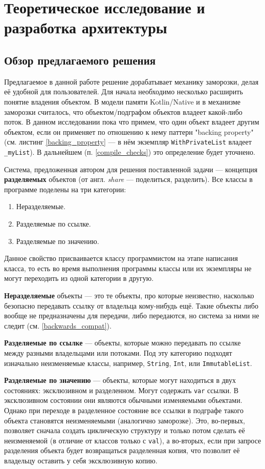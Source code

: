 \documentclass[specification,annotation,times]{itmo-student-thesis}
\begin{document}
\chapter{Теоретическое исследование и разработка архитектуры}

\section{Обзор предлагаемого решения}\label{overview}

Предлагаемое в данной работе решение дорабатывает механику заморозки, делая её удобной для пользователей.
Для начала необходимо несколько расширить понятие владения объектом.
В модели памяти Kotlin/Native и в механизме заморозки считалось, что объектом/подграфом объектов владеет какой-либо поток.
В данном исследовании пока что примем, что один объект владеет другим объектом, если он применяет по отношению к нему паттерн "backing property" (см. листинг \ref{backing_property} --- в нём экземпляр \texttt{WithPrivateList} владеет \texttt{\_myList}). В дальнейшем (п. \ref{compile_checks}) это определение будет уточнено.

Система, предложенная автором для решения поставленной задачи --- концепция \textbf{разделяемых} объектов (от англ. \textit{share} --- поделиться, разделить).
Все классы в программе поделены на три категории:
\begin{enumerate}
	\item Неразделяемые.
	\item Разделяемые по ссылке.
	\item Разделяемые по значению.
\end{enumerate}

Данное свойство присваивается классу программистом на этапе написания класса, то есть во время выполнения программы классы или их экземпляры не могут переходить из одной категории в другую.

\textbf{Неразделяемые} объекты --- это те объекты, про которые неизвестно, насколько безопасно передавать ссылку от владельца кому-нибудь ещё.
Такие объекты либо вообще не предназначены для передачи, либо передаются, но система за ними не следит (см. \ref{backwards_compat}).

\textbf{Разделяемые по ссылке} --- объекты, которые можно передавать по ссылке между разными владельцами или потоками.
Под эту категорию подходят изначально неизменяемые классы, например, \texttt{String}, \texttt{Int}, или \texttt{ImmutableList}.

\textbf{Разделяемые по значению} --- объекты, которые могут находиться в двух состояниях: эксклюзивном и разделенном. Могут содержать \texttt{var} ссылки.
В эксклюзивном состоянии они являются обычными изменяемыми объектами.
Однако при переходе в разделенное состояние все ссылки в подграфе такого объекта становятся неизменяемыми (аналогично заморозке).
Это, во-первых, позволяет сначала создать циклическую структуру и только потом сделать её неизменяемой (в отличие от классов только с \texttt{val}),
а во-вторых, если при запросе разделения объекта будет возвращаться разделенная копия, что позволит её владельцу оставить у себя эксклюзивную копию.
\end{document}
